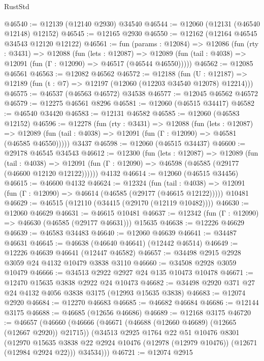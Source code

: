 \begin{lexlean}{RustStd}
\begin{coremodule}
@46540 := @12139 (@12140 @2930) @34540
@46544 := @12060 (@12131 (@46540 @12148) @12152)
@46545 := @12165 @2930
@46550 := @12162 (@12164 @46545 @34543 @12120 @12122)
@46561 := fun (params : @12084) =>
  @12086
    (fun (rty : @3431) =>
    @12088
      (fun (lets : @12087) =>
      @12089 (fun (tail : @4038) => @12091 (fun (Γ : @12090) => @46517 (@46544 @46550)))))
@46562 := @12085 @46561
@46563 := @12082 @46562
@46572 := @12188
    (fun (U : @12187) => @12189 (fun (t : @7) => @12197 (@12060 (@12203 @34540 @12078) @12214)))
@46575 := @46537 (@46563 @46572) @34538
@46577 := @12045 @46562 @46572
@46579 := @12275 @46561 @8296
@46581 := @12060 (@46515 @34417)
@46582 := @46540 @34420
@46583 := @12131 @46582
@46585 := @12060 (@46583 @12152)
@46596 := @12278
    (fun (rty : @3431) =>
    @12088
      (fun (lets : @12087) =>
      @12089 (fun (tail : @4038) => @12091 (fun (Γ : @12090) => @46581 (@46585 @46550)))))
    @3437
@46598 := @12060 (@46515 @34437)
@46600 := @29178 @46545 @34543
@46612 := @12300
    (fun (lets : @12087) =>
    @12089
      (fun (tail : @4038) =>
      @12091 (fun (Γ : @12090) => @46598 (@46585 (@29177 (@46600 @12120 @12122))))))
    @4132
@46614 := @12060 (@46515 @34456)
@46615 := @46600 @4132
@46624 := @12324
    (fun (tail : @4038) => @12091 (fun (Γ : @12090) => @46614 (@46585 (@29177 (@46615 @12122)))))
    @10481
@46629 := @46515 (@12110 (@34415 (@29170 (@12119 @10482))))
@46630 := @12060 @46629
@46631 := @46615 @10481
@46637 := @12342 (fun (Γ : @12090) => @46630 (@46585 (@29177 @46631))) @15635
@46638 := @12226 @46629
@46639 := @46583 @34483
@46640 := @12060 @46639
@46641 := @34487 @46631
@46645 := @46638 (@46640 @46641) (@12442 @46514)
@46649 := @12226 @46639 @46641 (@12447 @46582)
@46657 := @34498 @2915 @2928 @3059 @24 @4132 @10479 @3838 @3110
@46660 := @34508 @2928 @3059 @10479
@46666 := @34513 @2922 @2927 @24 @135 @10473 @10478
@46671 := @12470 @15635 @3838 @2922 @24 @10473
@46682 := @34498 @2920 @371 @27 @24 @4132 @4056 @3838 @3175 (@12993 @15635 @3838)
@46683 := @12074 @2920
@46684 := @12270 @46683
@46685 := @46682 @46684
@46686 := @12144 @3175
@46688 := @46685 (@12656 @46686)
@46689 := @12168 @3175
@46720 := @46657
    (@46660
      (@46666
        (@46671 (@46688 (@12660 @46689) (@12665 (@12667 @2920)) @21715))
        (@34513
          @2925
          @1764
          @22
          @51
          @10476
          @8301
          (@12970
            @15635
            @3838
            @22
            @2924
            @10476
            (@12978 (@12979 @10476))
            (@12671 (@12984 @2924 @22)))
          @34534)))
@46721 := @12074 @2915

\end{coremodule}
\end{lexlean}
